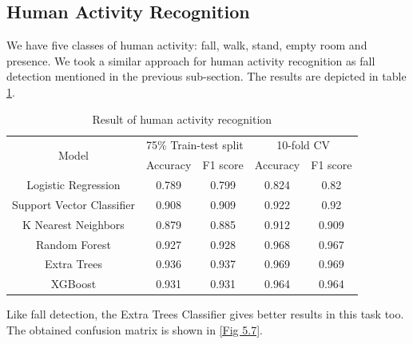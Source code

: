 \subsection{Human Activity Recognition}
We have five classes of human activity: fall, walk, stand, empty room and presence. We took a similar approach for human activity recognition as fall detection mentioned in the previous sub-section. The results are depicted in table \ref{Table 5.2}.

\begin{table}[H]
\caption{Result of human activity recognition}
\vspace{2mm}
\centering
\begin{tabular}{|c|cc|cc|}
\hline
\multirow{2}{*}{Model}    & \multicolumn{2}{c|}{75\% Train-test split}     & \multicolumn{2}{c|}{10-fold CV}          \\ \cline{2-5} 
                          & \multicolumn{1}{c|}{Accuracy} & F1 score & \multicolumn{1}{c|}{Accuracy} & F1 score \\ \hline
Logistic Regression       & \multicolumn{1}{c|}{0.789}    & 0.799    & \multicolumn{1}{c|}{0.824}    & 0.82     \\
Support Vector Classifier & \multicolumn{1}{c|}{0.908}    & 0.909    & \multicolumn{1}{c|}{0.922}    & 0.92     \\
K Nearest Neighbors       & \multicolumn{1}{c|}{0.879}    & 0.885    & \multicolumn{1}{c|}{0.912}    & 0.909    \\
Random Forest             & \multicolumn{1}{c|}{0.927}    & 0.928    & \multicolumn{1}{c|}{0.968}    & 0.967    \\
Extra Trees               & \multicolumn{1}{c|}{0.936}    & 0.937    & \multicolumn{1}{c|}{0.969}    & 0.969    \\
XGBoost                   & \multicolumn{1}{c|}{0.931}    & 0.931    & \multicolumn{1}{c|}{0.964}    & 0.964    \\ \hline
\end{tabular}
\label{Table 5.2}
\end{table}

Like fall detection, the Extra Trees Classifier gives better results in this task too. The obtained confusion matrix is shown in \ref{Fig 5.7}.

